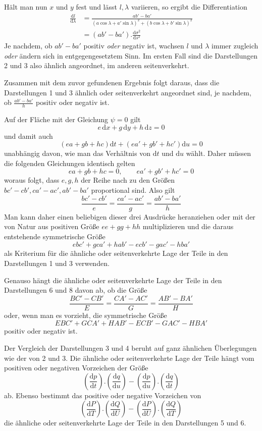 %
\noindent Hält man nun \(x\) und \(y\) fest und lässt \(l,\lambda\) variieren, so ergibt die Differentiation
\[
\begin{aligned}
\frac{\mathrm{d}l}{\mathrm{d}\lambda}&=\frac{ab'-ba'}{(a\cos\lambda+a'\sin\lambda)^2+(b\cos\lambda+b'\sin\lambda)^2}\\
&=(ab'-ba')\mathord{.}\frac{\mathrm{d}\sigma^2}{\mathrm{d}s^2}
\end{aligned}
\]
\noindent Je nachdem, ob \(ab'-ba'\) positiv \textit{oder} negativ ist, wachsen \(l\) und \(\lambda\) immer zugleich \textit{oder} ändern sich in entgegengesetztem Sinn. Im ersten Fall sind die Darstellungen 2 und 3 also ähnlich angeordnet, im anderen seitenverkehrt.

Zusammen mit dem zuvor gefundenen Ergebnis folgt daraus, dass die Darstellungen 1 und 3 ähnlich oder seitenverkehrt angeordnet sind, je nachdem, ob \(\frac{ab'-ba'}{h}\) positiv oder negativ ist.

Auf der Fläche mit der Gleichung \(\psi=0\) gilt
\[
e\,\mathrm{d}x+g\,\mathrm{d}y+h\,\mathrm{d}z=0
\]
\noindent und damit auch
\[
(ea+gb+hc)\mathrm{d}t+(ea'+gb'+hc')\mathrm{d}u=0
\]
\noindent unabhängig davon, wie man das Verhältnis von \(\mathrm{d}t\) und \(\mathrm{d}u\) wählt. Daher müssen die folgenden Gleichungen identisch gelten
\[
ea+gb+hc=0,\qquad ea'+gb'+hc'=0
\]
\noindent woraus folgt, dass \(e,g,h\) der Reihe nach zu den Größen \(bc'-cb',ca'-ac',ab'-ba'\) proportional sind. Also gilt
\[
\frac{bc'-cb'}{e}=\frac{ca'-ac'}{g}=\frac{ab'-ba'}{h}
\]
\noindent Man kann daher einen beliebigen dieser drei Ausdrücke heranziehen oder mit der von Natur aus positiven Größe \(ee+gg+hh\) multiplizieren und die daraus entstehende symmetrische Größe
\[
ebc'+gca'+hab'-ecb'-gac'-hba'
\]
\noindent als Kriterium für die ähnliche oder seitenverkehrte Lage der Teile in den Darstellungen 1 und 3 verwenden.

Genauso hängt die ähnliche oder seitenverkehrte Lage der Teile in den Darstellungen 6 und 8 davon ab, ob die Größe
\[
\frac{BC'-CB'}{E}=\frac{CA'-AC'}{G}=\frac{AB'-BA'}{H}
\]
%
\noindent oder, wenn man es vorzieht, die symmetrische Größe
\[
EBC'+GCA'+HAB'-ECB'-GAC'-HBA'
\]
\noindent positiv oder negativ ist.

Der Vergleich der Darstellungen 3 und 4 beruht auf ganz ähnlichen Überlegungen wie der von 2 und 3. Die ähnliche oder seitenverkehrte Lage der Teile hängt vom positiven oder negativen Vorzeichen der Größe
\[
(\frac{\mathrm{d}p}{\mathrm{d}t})\mathord{.}(\frac{\mathrm{d}q}{\mathrm{d}u})-(\frac{\mathrm{d}p}{\mathrm{d}u})\mathord{.}(\frac{\mathrm{d}q}{\mathrm{d}t})
\]
\noindent ab. Ebenso bestimmt das positive oder negative Vorzeichen von
\[
(\frac{\mathrm{d}P}{\mathrm{d}T})\mathord{.}(\frac{\mathrm{d}Q}{\mathrm{d}U})-(\frac{\mathrm{d}P}{\mathrm{d}U})\mathord{.}(\frac{\mathrm{d}Q}{\mathrm{d}T})
\]
\noindent die ähnliche oder seitenverkehrte Lage der Teile in den Darstellungen 5 und 6.

